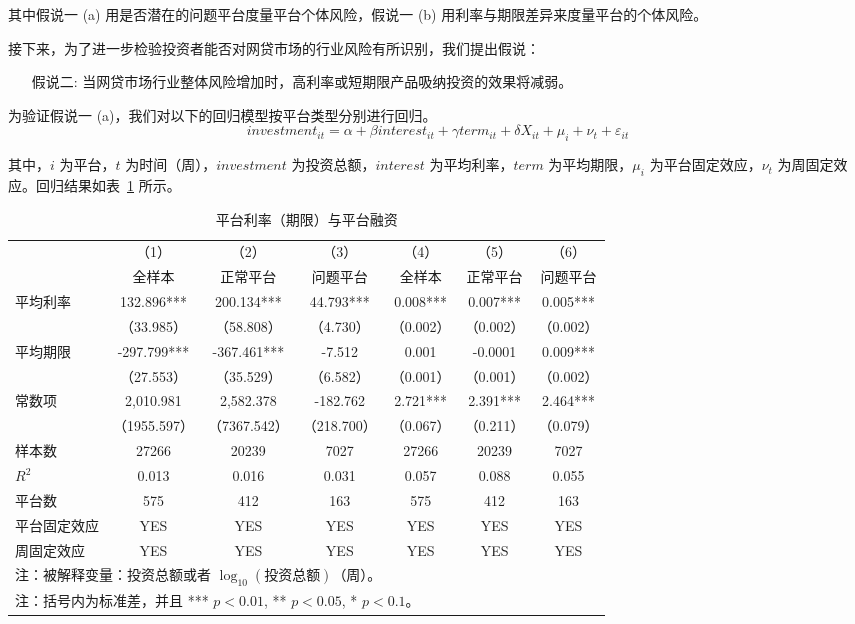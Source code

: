 \documentclass[lang=cn,11pt]{elegantpaper}
\begin{document}
其中假说一 (a) 用是否潜在的问题平台度量平台个体风险，假说一 (b) 用利率与期限差异来度量平台的个体风险。

接下来，为了进一步检验投资者能否对网贷市场的行业风险有所识别，我们提出假说：

\begin{enumerate}[leftmargin=6em]
\kaishu
\item[假说二: ] 当网贷市场行业整体风险增加时，高利率或短期限产品吸纳投资的效果将减弱。
\end{enumerate}

为验证假说一 (a)，我们对以下的回归模型按平台类型分别进行回归。
\begin{equation}\label{eq:interest}
      investment_{it} = \alpha + \beta interest_{it} + \gamma term_{it} + \delta X_{it} + \mu_i + \nu_t + \varepsilon_{it}
\end{equation}

其中，$i$ 为平台，$t$ 为时间（周），$investment$ 为投资总额，$interest$ 为平均利率，$term$ 为平均期限，$\mu_i$ 为平台固定效应，$\nu_t$ 为周固定效应。回归结果如表~\ref{tab:interest} 所示。

\begin{table}[htbp]
\centering
\caption{平台利率（期限）与平台融资\label{tab:interest}}
\begin{tabular}{lcccccc}
\toprule
      & （1）   & （2）   & （3）   & （4）   & （5）   & （6） \\
      & 全样本   & 正常平台  & 问题平台  & 全样本   & 正常平台  & 问题平台 \\
\midrule
平均利率  & 132.896*** & 200.134*** & 44.793*** & 0.008*** & 0.007*** & 0.005*** \\
      & （33.985） & （58.808） & （4.730） & （0.002） & （0.002） & （0.002） \\
平均期限  & -297.799*** & -367.461*** & -7.512 & 0.001 & -0.0001 & 0.009*** \\
      & （27.553） & （35.529） & （6.582） & （0.001） & （0.001） & （0.002） \\
常数项   & 2,010.981 & 2,582.378 & -182.762 & 2.721*** & 2.391*** & 2.464*** \\
      & （1955.597） & （7367.542） & （218.700） & （0.067） & （0.211） & （0.079） \\
样本数   & 27266 & 20239 & 7027  & 27266 & 20239 & 7027 \\
$R^2$    & 0.013 & 0.016 & 0.031 & 0.057 & 0.088 & 0.055 \\
平台数   & 575   & 412   & 163   & 575   & 412   & 163 \\
平台固定效应 & YES   & YES   & YES   & YES   & YES   & YES \\
周固定效应  & YES   & YES   & YES   & YES   & YES   & YES \\
\bottomrule
\multicolumn{7}{p{10cm}}{\scriptsize 注：被解释变量：投资总额或者 $\log_{10}(\text{投资总额})$（周）。}\\
\multicolumn{7}{p{10cm}}{\scriptsize 注：括号内为标准差，并且 *** $p<0.01$, ** $p<0.05$, * $p<0.1$。}
\end{tabular}%
\end{table}%
    
\end{document}
